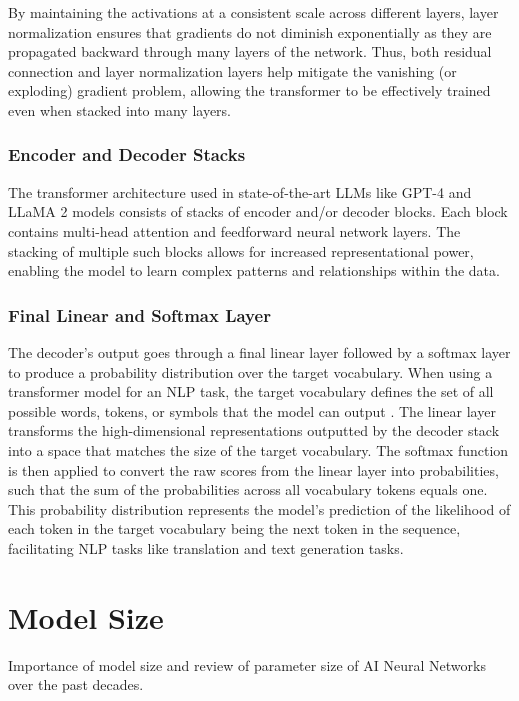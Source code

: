 By maintaining the activations at a consistent scale across different layers, layer normalization ensures that gradients do not diminish exponentially as they are propagated backward through many layers of the network. Thus, both residual connection and layer normalization layers help mitigate the vanishing (or exploding) gradient problem, allowing the transformer to be effectively trained even when stacked into many layers.

\subsubsection{Encoder and Decoder Stacks}

The transformer architecture used in state-of-the-art LLMs like GPT-4 \cite{achiam2023gpt} and LLaMA 2 \cite{touvron2023llama} models consists of stacks of encoder and/or decoder blocks. Each block contains multi-head attention and feedforward neural network layers. The stacking of multiple such blocks allows for increased representational power, enabling the model to learn complex patterns and relationships within the data.

\subsubsection{Final Linear and Softmax Layer}

The decoder’s output goes through a final linear layer followed by a softmax layer to produce a probability distribution over the target vocabulary. When using a transformer model for an NLP task, the target vocabulary defines the set of all possible words, tokens, or symbols that the model can output \cite{jozefowicz2016exploring}. The linear layer transforms the high-dimensional representations outputted by the decoder stack into a space that matches the size of the target vocabulary. The softmax function is then applied to convert the raw scores from the linear layer into probabilities, such that the sum of the probabilities across all vocabulary tokens equals one. This probability distribution represents the model’s prediction of the likelihood of each token in the target vocabulary being the next token in the sequence, facilitating NLP tasks like translation and text generation tasks.

\newpage

\section{Model Size}
Importance of model size and review of parameter size of AI Neural Networks over the past decades.

